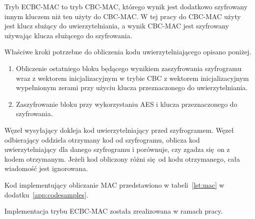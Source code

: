 Tryb ECBC-MAC to tryb CBC-MAC, którego wynik jest dodatkowo szyfrowany innym kluczem niż ten użyty do CBC-MAC. W tej pracy do CBC-MAC użyty jest klucz służący do uwierzytelniania, a wynik CBC-MAC jest szyfrowany używając klucza służącego do szyfrowania.

Właściwe kroki potrzebne do obliczenia kodu uwierzytelniającego opisano poniżej.

\begin{enumerate}
\item Obliczenie ostatniego bloku będącego wynikiem zaszyfrowania szyfrogramu wraz z wektorem inicjalizacyjnym w trybie CBC z wektorem inicjalizacyjnym wypełnionym zerami przy użyciu klucza przeznaczonego do uwierzytelniania.
\item Zaszyfrowanie bloku przy wykorzystaniu AES i klucza przeznaczonego do szyfrowania.
\end{enumerate}

Węzeł wysyłający dokleja kod uwierzytelniający przed szyfrogramem. Węzeł odbierający oddziela otrzymany kod od szyfrogramu, oblicza kod uwierzytelniający dla danego szyfrogramu i porównuje, czy zgadza się on z kodem otrzymanym. Jeżeli kod obliczony różni się od kodu otrzymanego, cała wiadomość jest ignorowana.

Kod implementujący obliczanie MAC przedstawiono w tabeli~\ref{lst:mac} w dodatku~\ref{app:codesamples}.

Implementacja trybu ECBC-MAC została zrealizowana w ramach pracy.
